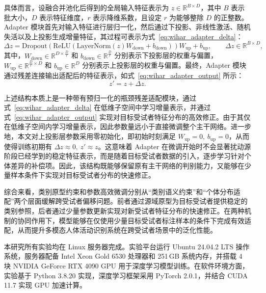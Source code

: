 具体而言，设融合并池化后得到的全局输入特征表示为 $z \in \mathbb{R}^{B \times D}$，其中 $B$ 表示批大小，$D$ 表示特征维度，$r$ 表示降维系数，且设定 $r$ 为能够整除 $D$ 的正整数。Adapter 模块首先对输入特征进行层归一化，然后通过下投影、非线性激活、随机失活以及上投影生成增量特征，其过程可表示为式~\eqref{eq:wihar_adapter_delta}：
\begin{equation}
\Delta z = \mathrm{Dropout}\!\left(\mathrm{ReLU}\!\left(\mathrm{LayerNorm}(z) W_{\mathrm{down}} + b_{\mathrm{down}}\right)\right) W_{\mathrm{up}} + b_{\mathrm{up}},
\qquad \Delta z \in \mathbb{R}^{B \times D},
\label{eq:wihar_adapter_delta}
\end{equation}
其中，$W_{\mathrm{down}} \in \mathbb{R}^{D \times \frac{D}{r}}$ 和 $b_{\mathrm{down}} \in \mathbb{R}^{\frac{D}{r}}$ 分别表示下投影层的权重与偏置，$W_{\mathrm{up}} \in \mathbb{R}^{\frac{D}{r}\times D}$ 和 $b_{\mathrm{up}} \in \mathbb{R}^{D}$ 分别表示上投影层的权重与偏置。最终，Adapter 模块通过残差连接输出适配后的特征表示，如式~\eqref{eq:wihar_adapter_output} 所示：
\begin{equation}
z' = z + \Delta z.
\label{eq:wihar_adapter_output}
\end{equation}

上述结构本质上是一种带有预归一化的瓶颈残差适配模块，通过式~\eqref{eq:wihar_adapter_delta} 在低维子空间中学习增量表示，并通过式~\eqref{eq:wihar_adapter_output} 实现对目标受试者特征分布的高效修正。由于其仅在低维子空间内学习增量表示，因此参数量远小于直接微调整个主干网络。进一步地，本文对上投影层参数采用零初始化，即初始时刻满足 $W_{\mathrm{up}}=0,\ b_{\mathrm{up}}=0$，从而使得训练初期有 $\Delta z \approx 0,\ z' \approx z$。这意味着 Adapter 在微调开始时不会显著扰动源阶段已经学到的稳定特征表示，而是随着目标受试者数据的引入，逐步学习针对个体差异的补偿项。因此，该结构既能够保留原有主干网络的判别能力，又能够在少量样本条件下实现对目标受试者分布的快速修正。

综合来看，类别原型约束和参数高效微调分别从“类别语义约束”和“个体分布适配”两个层面缓解跨受试者偏移问题。前者通过源域原型为目标受试者提供稳定的类别参照，后者通过少量参数更新实现对新受试者特征分布的快速修正。在两种机制的协同作用下，模型能够在仅使用少量目标受试者标注样本的条件下完成有效适配，从而提升多模态人体活动识别系统在跨受试者场景中的泛化性能。



本研究所有实验均在 Linux 服务器完成。实验平台运行 Ubuntu 24.04.2 LTS 操作系统，服务器配备 Intel Xeon Gold 6530 处理器和 251\,GB 系统内存，并搭载 4 块 NVIDIA GeForce RTX 4090 GPU 用于深度学习模型训练。在软件环境方面，实验基于 Python 3.8.20 实现，深度学习框架采用 PyTorch 2.0.1，并结合 CUDA 11.7 实现 GPU 加速计算。

